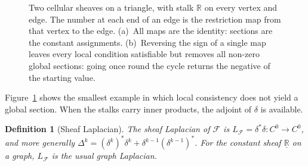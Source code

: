 \documentclass[11pt,a4paper,oneside]{scrartcl}
\theoremstyle{guideplain}
\theoremstyle{guidedef}
\newtheorem{definition}[theorem]{Definition}
\newcommand{\F}{\mathcal{F}}
\newcommand{\R}{\mathbb{R}}
\begin{document}
\begin{figure}[tp]
  \centering
  \caption{Two cellular sheaves on a triangle, with stalk $\R$ on every vertex and edge. The
    number at each end of an edge is the restriction map from that vertex to the edge. (a)~All maps are the identity: sections are the
    constant assignments. (b)~Reversing the sign of a single map leaves every local condition
    satisfiable but removes all non-zero global sections: going once round the cycle returns the
    negative of the starting value.}
  \label{fig:triangle}
\end{figure}

Figure~\ref{fig:triangle} shows the smallest example in which local consistency does not yield a
global section. When the stalks carry inner products, the adjoint of $\delta$ is available.

\begin{definition}[Sheaf Laplacian]
  The \emph{sheaf Laplacian} of $\F$ is $L_{\F}=\delta^{*}\delta\colon C^0\to C^0$, and more generally
  $\Delta^k=(\delta^{k})^{*}\delta^{k}+\delta^{k-1}(\delta^{k-1})^{*}$. For the constant sheaf
  $\underline{\R}$ on a graph, $L_{\F}$ is the usual graph Laplacian.
\end{definition}
\end{document}
